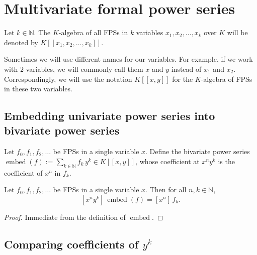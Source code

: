 \section{Multivariate formal power series}

\begin{definition}
\label{def.fps.mulvar.algebra}
\leanhelper
\leanok
Let $k\in\mathbb{N}$. The $K$-algebra of all FPSs in $k$ variables
$x_{1},x_{2},\ldots,x_{k}$ over $K$ will be denoted by $K\left[  \left[
x_{1},x_{2},\ldots,x_{k}\right]  \right]  $.

Sometimes we will use different names for our variables. For example, if we
work with $2$ variables, we will commonly call them $x$ and $y$ instead of
$x_{1}$ and $x_{2}$. Correspondingly, we will use the notation $K\left[
\left[  x,y\right]  \right]  $ for the $K$-algebra of FPSs in these two variables.
\end{definition}

\subsection{Embedding univariate power series into bivariate power series}

\begin{definition}
\label{def.fps.mulvar.embedUnivInBiv}
\leanhelper
\leanok
Let $f_0, f_1, f_2, \ldots$ be FPSs in a single variable $x$.
Define the bivariate power series
$\operatorname{embed}(f) := \sum_{k \in \mathbb{N}} f_k \, y^k \in K[[x,y]]$,
whose coefficient at $x^n y^k$ is the coefficient of $x^n$ in $f_k$.
\end{definition}

\begin{lemma}
\label{lem.fps.mulvar.coeff-embed}
\leanhelper
\leanok
Let $f_0, f_1, f_2, \ldots$ be FPSs in a single variable $x$.
Then for all $n, k \in \mathbb{N}$,
\[
[x^n y^k]\, \operatorname{embed}(f) = [x^n]\, f_k.
\]
\end{lemma}

\begin{proof}
Immediate from the definition of $\operatorname{embed}$.
\end{proof}

\subsection{Comparing coefficients of $y^k$}

